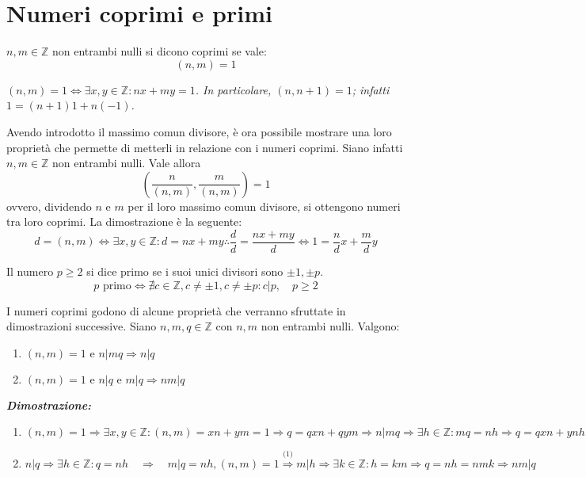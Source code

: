 \section{Numeri coprimi e primi}
\begin{tcolorbox}[colback=yellow!30, colframe=yellow!30!black, title=Numeri coprimi]
$n,m \in \mathbb{Z}$ non entrambi nulli si dicono coprimi se vale:
\[(n,m)=1\]
\end{tcolorbox}
\begin{osservaz}
\emph{$(n,m) = 1 \Longleftrightarrow \exists x,y \in \mathbb{Z}:
nx + my = 1$. In particolare, $(n,n+1)=1$; infatti $1 = (n+1)1 + n(-1)$.}
\end{osservaz}
Avendo introdotto il massimo comun divisore, è ora possibile mostrare
una loro proprietà che permette di metterli in relazione con i
numeri coprimi. Siano infatti $n,m\in\mathbb{Z}$ non entrambi nulli.
Vale allora \[ \left(\frac{n}{(n,m)},\frac{m}{(n,m)}\right) = 1 \]
ovvero, dividendo $n$ e $m$ per il loro massimo comun divisore, si ottengono
numeri tra loro coprimi. La dimostrazione è la seguente:
\[ d = (n,m) \Longleftrightarrow \exists x,y\in\mathbb{Z}: d = nx + my \therefore \frac{d}{d} = \frac{nx+my}{d} \Longleftrightarrow 1 = \frac{n}{d}x + \frac{m}{d}y \]
\cvd

\begin{tcolorbox}[colback=yellow!30, colframe=yellow!30!black, title=Numero primo]
Il numero $p \geq 2$ si dice primo se i suoi unici divisori sono $\pm 1, \pm p$.
\[ p \text{ primo} \Longleftrightarrow \nexists c\in\mathbb{Z}, c\not=\pm1, c\not=\pm p: c|p, \quad p\geq2 \]
\end{tcolorbox}

I numeri coprimi godono di alcune proprietà che verranno sfruttate
in dimostrazioni successive. Siano $n,m,q\in\mathbb{Z}$ con $n,m$
non entrambi nulli. Valgono:
\begin{enumerate}
\item $(n,m) = 1 \text{ e } n|mq \Longrightarrow n|q$
\item $(n,m) = 1 \text{ e } n|q \text{ e } m|q \Longrightarrow nm|q$
\end{enumerate}
\textit{\textbf{Dimostrazione:}}
\begin{enumerate}
\item $(n,m)=1\Rightarrow\exists x,y\in\mathbb{Z}:(n,m)=xn+ym=1\Rightarrow q=qxn+qym\Rightarrow n|mq\Rightarrow\exists h\in\mathbb{Z}:mq=nh\Rightarrow q=qxn+ynh = n(qx+yh)\Rightarrow n|q$
\item $n|q\Rightarrow\exists h\in\mathbb{Z}:q=nh \quad\Rightarrow\quad m|q=nh, (n,m)=1\stackrel{\text{(1)}}{\Longrightarrow} m|h \Rightarrow\exists k\in\mathbb{Z}:h=km\Rightarrow q=nh=nmk\Rightarrow nm|q$
\end{enumerate}
\cvd

